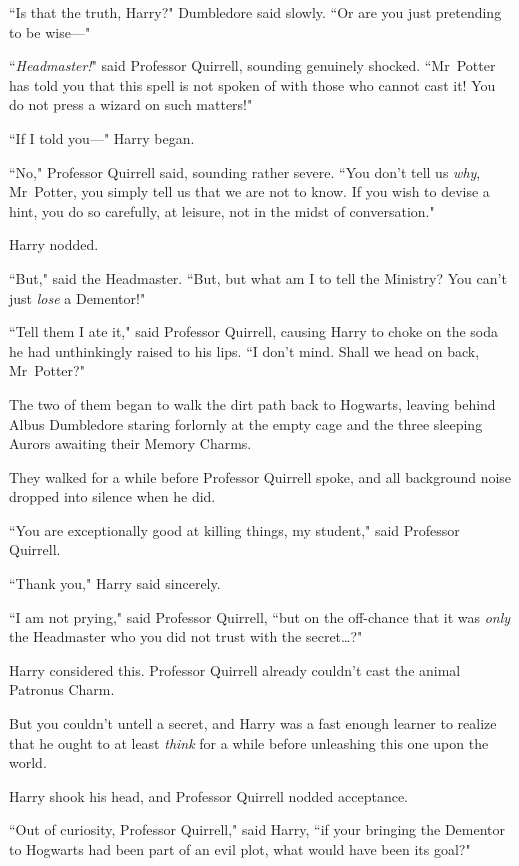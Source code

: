 ``Is that the truth, Harry?" Dumbledore said slowly. ``Or are you just pretending to be wise—"

``\emph{Headmaster!}" said Professor Quirrell, sounding genuinely shocked. ``Mr~Potter has told you that this spell is not spoken of with those who cannot cast it! You do not press a wizard on such matters!"

``If I told you—" Harry began.

``No," Professor Quirrell said, sounding rather severe. ``You don't tell us \emph{why}, Mr~Potter, you simply tell us that we are not to know. If you wish to devise a hint, you do so carefully, at leisure, not in the midst of conversation."

Harry nodded.

``But," said the Headmaster. ``But, but what am I to tell the Ministry? You can't just \emph{lose} a Dementor!"

``Tell them I ate it," said Professor Quirrell, causing Harry to choke on the soda he had unthinkingly raised to his lips. ``I don't mind. Shall we head on back, Mr~Potter?"

The two of them began to walk the dirt path back to Hogwarts, leaving behind Albus Dumbledore staring forlornly at the empty cage and the three sleeping Aurors awaiting their Memory Charms.


They walked for a while before Professor Quirrell spoke, and all background noise dropped into silence when he did.

``You are exceptionally good at killing things, my student," said Professor Quirrell.

``Thank you," Harry said sincerely.

``I am not prying," said Professor Quirrell, ``but on the off-chance that it was \emph{only} the Headmaster who you did not trust with the secret{\ldots}?"

Harry considered this. Professor Quirrell already couldn't cast the animal Patronus Charm.

But you couldn't untell a secret, and Harry was a fast enough learner to realize that he ought to at least \emph{think} for a while before unleashing this one upon the world.

Harry shook his head, and Professor Quirrell nodded acceptance.

``Out of curiosity, Professor Quirrell," said Harry, ``if your bringing the Dementor to Hogwarts had been part of an evil plot, what would have been its goal?"

